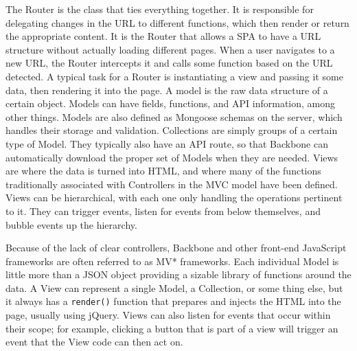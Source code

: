 \documentclass[12pt]{article}
\newcommand{\code}[1]{{\texttt {#1}}}
\begin{document}
The Router is the class that ties everything together. 
It is responsible for delegating changes in the URL to different functions, which then render or return the appropriate content. 
It is the Router that allows a SPA to have a URL structure without actually loading different pages. 
When a user navigates to a new URL, the Router intercepts it and calls some function based on the URL detected. 
A typical task for a Router is instantiating a view and passing it some data, then rendering it into the page. 
A model is the raw data structure of a certain object. 
Models can have fields, functions, and API information, among other things.  
Models are also defined as Mongoose schemas on the server, which handles their storage and validation. 
Collections are simply groups of a certain type of Model. 
They typically also have an API route, so that Backbone can automatically download the proper set of Models when they are needed. 
Views are where the data is turned into HTML, and where many of the functions traditionally associated with Controllers in the MVC model have been defined. 
Views can be hierarchical, with each one only handling the operations pertinent to it. 
They can trigger events, listen for events from below themselves, and bubble events up the hierarchy. 

Because of the lack of clear controllers, Backbone and other front-end JavaScript frameworks are often referred to as MV* frameworks. 
Each individual Model is little more than a JSON object providing a sizable library of functions around the data. 
A View can represent a single Model, a Collection, or some thing else, but it always has a \code{render()} function that prepares and injects the HTML into the page, usually using jQuery. 
Views can also listen for events that occur within their scope; for example, clicking a button that is part of a view will trigger an event that the View code can then act on. 
\end{document}
